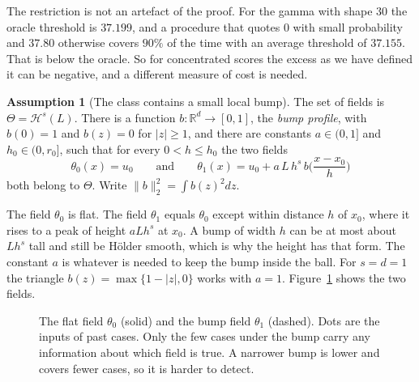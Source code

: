 \documentclass[11pt]{article}
\theoremstyle{definition}
\newtheorem{assumption}{Assumption}
\theoremstyle{remark}
\newcommand{\R}{\mathbb{R}}
\begin{document}
The restriction is not an artefact of the proof. For the gamma with shape $30$ the oracle
threshold is $37.199$, and a procedure that quotes $0$ with small probability and $37.80$
otherwise covers $90\%$ of the time with an average threshold of $37.155$. That is below
the oracle. So for concentrated scores the excess as we have defined it can be negative,
and a different measure of cost is needed.

\begin{assumption}[The class contains a small local bump]\label{as:holder}
The set of fields is $\Theta=\mathcal H^s(L)$. There is a function $b:\R^d\to[0,1]$, the
\emph{bump profile}, with $b(0)=1$ and $b(z)=0$ for $|z|\ge1$, and there are constants
$a\in(0,1]$ and $h_0\in(0,r_0]$, such that for every $0<h\le h_0$ the two fields
\[
  \theta_0(x)=u_0
  \qquad\text{and}\qquad
  \theta_1(x)=u_0+a\,L\,h^{s}\,b\Big(\frac{x-x_0}{h}\Big)
\]
both belong to $\Theta$. Write $\|b\|_2^2=\int b(z)^2dz$.
\end{assumption}

The field $\theta_0$ is flat. The field $\theta_1$ equals $\theta_0$ except within distance
$h$ of $x_0$, where it rises to a peak of height $aLh^s$ at $x_0$. A bump of width $h$ can
be at most about $Lh^s$ tall and still be H\"older smooth, which is why the height has that
form. The constant $a$ is whatever is needed to keep the bump inside the ball. For $s=d=1$
the triangle $b(z)=\max\{1-|z|,0\}$ works with $a=1$. Figure~\ref{fig:bump} shows the two
fields.

\begin{figure}[h]
\centering
{}
\caption{The flat field $\theta_0$ (solid) and the bump field $\theta_1$ (dashed). Dots are
the inputs of past cases. Only the few cases under the bump carry any information about
which field is true. A narrower bump is lower and covers fewer cases, so it is harder to
detect.}
\label{fig:bump}
\end{figure}
\end{document}

